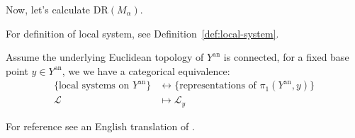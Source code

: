 Now, let's calculate $\mathrm{DR}(M_{\mathfrak{\alpha}})$.

\begin{proposition}\label{prop:classification-of-local-system}
    For definition of local system, see Definition~\ref{def:local-system}.

    Assume the underlying Euclidean topology of $Y^{\mathrm{an}}$ is connected, for a fixed base point $y\in Y^{\mathrm{an}}$, we
    we have a categorical equivalence:
    \begin{align*}
        \{\text{local systems on } Y^{\mathrm{an}}\} & \longleftrightarrow \{\text{representations of } \pi_1(Y^{\mathrm{an}},y)\} \\
        \mathcal{L}                                  & \longmapsto \mathcal{L}_y
    \end{align*}

    For reference see an English translation of \cite[Prop.~1.3., Cor.~1.4.]{DeligneLNM163}.
\end{proposition}


